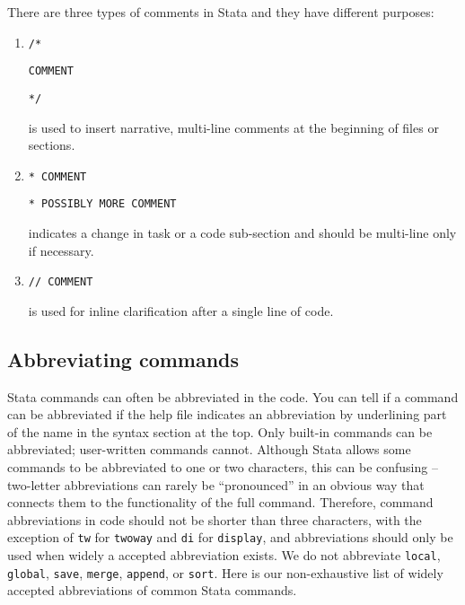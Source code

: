 There are three types of comments in Stata and they have different purposes:
\begin{enumerate}
  \item \texttt{/*}

  \texttt{COMMENT}

  \texttt{*/}

  is used to insert narrative, multi-line comments at the beginning of files or sections.
  \item \texttt{* COMMENT}

  \texttt{* POSSIBLY MORE COMMENT}

  indicates a change in task or a code sub-section and should be multi-line only if necessary.
  \item \texttt{// COMMENT}

  is used for inline clarification after a single line of code.
\end{enumerate}


\subsection{Abbreviating commands}

Stata commands can often be abbreviated in the code.
You can tell if a command can be abbreviated if the help file indicates an abbreviation by underlining part of the name in the syntax section at the top.
Only built-in commands can be abbreviated; user-written commands cannot.
Although Stata allows some commands to be abbreviated to one or two characters,
this can be confusing -- two-letter abbreviations can rarely be ``pronounced''
in an obvious way that connects them to the functionality of the full command.
Therefore, command abbreviations in code should not be shorter than three characters,
with the exception of \texttt{tw} for \texttt{twoway} and \texttt{di} for \texttt{display},
and abbreviations should only be used when widely a accepted abbreviation exists.
We do not abbreviate \texttt{local}, \texttt{global}, \texttt{save}, \texttt{merge}, \texttt{append}, or \texttt{sort}.
Here is our non-exhaustive list of widely accepted abbreviations of common Stata commands.

